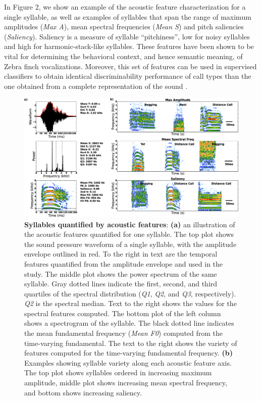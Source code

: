     In Figure 2, we show an example of the acoustic feature characterization for a single syllable, as well as examples of syllables that span the range of maximum amplitudes ({\em Max A}), mean spectral frequencies ({\em Mean S}) and pitch saliencies ({\em Saliency}). Saliency is a measure of syllable “pitchiness”, low for noisy syllables and high for harmonic-stack-like syllables. These features have been shown to be vital for determining the behavioral context, and hence semantic meaning, of Zebra finch vocalizations. Moreover, this set of features can be used in supervised classifiers to obtain identical discriminability performance of call types than the one obtained from a complete representation of the sound \cite{Elie2015b}.

\begin{figure}
    \caption{\textbf{Syllables quantified by acoustic features}: \textbf{(a)} an illustration of the acoustic features quantified for one syllable. The top plot shows the sound pressure waveform of a single syllable, with the amplitude envelope outlined in red. To the right in text are the temporal features quantified from the amplitude envelope and used in the study. The middle plot shows the power spectrum of the same syllable. Gray dotted lines indicate the first, second, and third quartiles of the spectral distribution ({\em Q1}, {\em Q2}, and {\em Q3}, respectively). {\em Q2} is the spectral median. Text to the right shows the values for the spectral features computed. The bottom plot of the left column shows a spectrogram of the syllable. The black dotted line indicates the mean fundamental frequency ({\em Mean F0}) computed from the time-varying fundamental. The text to the right shows the variety of features computed for the time-varying fundamental frequency. \textbf{(b)} Examples showing syllable variety along each acoustic feature axis. The top plot shows syllables ordered in increasing maximum amplitude, middle plot shows increasing mean spectral frequency, and bottom shows increasing saliency.}
    \centering
    \includegraphics[scale=0.25]{figure2.eps}
\end{figure}

